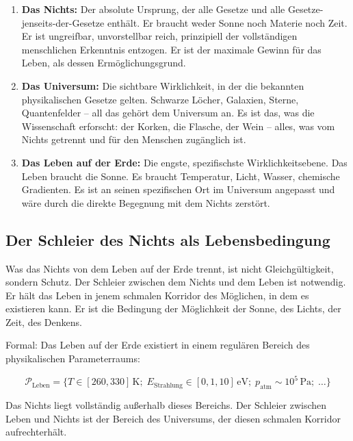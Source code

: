 ﻿\documentclass[12pt,a4paper]{report}
\begin{document}
\begin{enumerate}
	\item \textbf{Das Nichts:} Der absolute Ursprung, der alle Gesetze und alle Gesetze-jenseits-der-Gesetze enthält. Er braucht weder Sonne noch Materie noch Zeit. Er ist ungreifbar, unvorstellbar reich, prinzipiell der vollständigen menschlichen Erkenntnis entzogen. Er ist der maximale Gewinn für das Leben, als dessen Ermöglichungsgrund.

	\item \textbf{Das Universum:} Die sichtbare Wirklichkeit, in der die bekannten physikalischen Gesetze gelten. Schwarze Löcher, Galaxien, Sterne, Quantenfelder -- all das gehört dem Universum an. Es ist das, was die Wissenschaft erforscht: der Korken, die Flasche, der Wein -- alles, was vom Nichts getrennt und für den Menschen zugänglich ist.

	\item \textbf{Das Leben auf der Erde:} Die engste, spezifischste Wirklichkeitsebene. Das Leben braucht die Sonne. Es braucht Temperatur, Licht, Wasser, chemische Gradienten. Es ist an seinen spezifischen Ort im Universum angepasst und wäre durch die direkte Begegnung mit dem Nichts zerstört.
\end{enumerate}

\subsection{Der Schleier des Nichts als Lebensbedingung}

Was das Nichts von dem Leben auf der Erde trennt, ist nicht Gleichgültigkeit, sondern Schutz. Der Schleier zwischen dem Nichts und dem Leben ist notwendig. Er hält das Leben in jenem schmalen Korridor des Möglichen, in dem es existieren kann. Er ist die Bedingung der Möglichkeit der Sonne, des Lichts, der Zeit, des Denkens.

Formal: Das Leben auf der Erde existiert in einem regulären Bereich des physikalischen Parameterraums:

\begin{equation}
	\mathcal{P}_{\text{Leben}} = \bigl\{T \in [260, 330]\,\text{K};\; E_{\text{Strahlung}} \in [0{,}1, 10]\,\text{eV};\; p_{\text{atm}} \sim 10^5\,\text{Pa};\; \ldots\bigr\}
	\label{eq:parameter_leben}
\end{equation}

Das Nichts liegt vollständig außerhalb dieses Bereichs. Der Schleier zwischen Leben und Nichts ist der Bereich des Universums, der diesen schmalen Korridor aufrechterhält.
\end{document}
